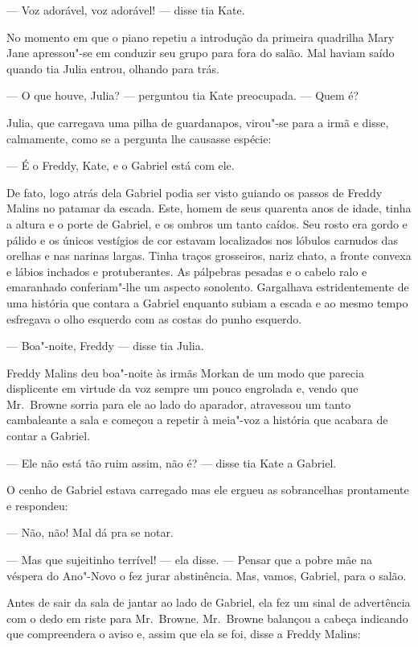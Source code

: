 --- Voz adorável, voz adorável! --- disse tia Kate.

No momento em que o piano repetiu a introdução da primeira quadrilha Mary Jane
apressou"-se em conduzir seu grupo para fora do salão.  Mal haviam saído quando
tia Julia entrou, olhando para trás.

--- O que houve, Julia? --- perguntou tia Kate preocupada.  --- Quem é?

Julia, que carregava uma pilha de guardanapos, virou"-se para a irmã e disse,
calmamente, como se a pergunta lhe causasse espécie:

--- É o Freddy, Kate, e o Gabriel está com ele.

De fato, logo atrás dela Gabriel podia ser visto guiando os passos de Freddy
Malins no patamar da escada.  Este, homem de seus quarenta anos de idade, tinha
a altura e o porte de Gabriel, e os ombros um tanto caídos.  Seu rosto era
gordo e pálido e os únicos vestígios de cor estavam localizados nos lóbulos
carnudos das orelhas e nas narinas largas.  Tinha traços grosseiros, nariz
chato, a fronte convexa e lábios inchados e protuberantes.  As pálpebras
pesadas e o cabelo ralo e emaranhado conferiam"-lhe um aspecto sonolento.
Gargalhava estridentemente de uma história que contara a Gabriel enquanto
subiam a escada e ao mesmo tempo esfregava o olho esquerdo com as costas do
punho esquerdo.

--- Boa"-noite, Freddy --- disse tia Julia.

Freddy Malins deu boa"-noite às irmãs Morkan de um modo que parecia displicente
em virtude da voz sempre um pouco engrolada e, vendo que Mr.~Browne sorria para
ele ao lado do aparador, atravessou um tanto cambaleante a sala e começou a
repetir à meia"-voz a história que acabara de contar a Gabriel.

--- Ele não está tão ruim assim, não é? --- disse tia Kate a Gabriel.

O cenho de Gabriel estava carregado mas ele ergueu as sobrancelhas prontamente
e respondeu:

--- Não, não!  Mal dá pra se notar.

--- Mas que sujeitinho terrível! --- ela disse.  --- Pensar que a pobre mãe na
véspera do Ano"-Novo o fez jurar abstinência.  Mas, vamos, Gabriel, para o
salão.

Antes de sair da sala de jantar ao lado de Gabriel, ela fez um sinal de
advertência com o dedo em riste para Mr.~Browne.  Mr.~Browne balançou a cabeça
indicando que compreendera o aviso e, assim que ela se foi, disse a Freddy
Malins:

